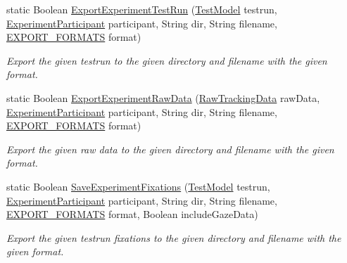 \begin{DoxyCompactItemize}
static Boolean \hyperlink{class_web_analyzer_1_1_controller_1_1_export_controller_a9f312de4f46d4bfb9c33b4f7ce79e79d}{Export\+Experiment\+Test\+Run} (\hyperlink{class_web_analyzer_1_1_models_1_1_data_model_1_1_test_model}{Test\+Model} testrun, \hyperlink{class_web_analyzer_1_1_models_1_1_base_1_1_experiment_participant}{Experiment\+Participant} participant, String dir, String filename, \hyperlink{class_web_analyzer_1_1_controller_1_1_export_controller_a8cea4a311ecaf495f305f9d7829a57aa}{E\+X\+P\+O\+R\+T\+\_\+\+F\+O\+R\+M\+A\+T\+S} format)
\begin{DoxyCompactList}\small\item\em Export the given testrun to the given directory and filename with the given format. \end{DoxyCompactList}\item 
static Boolean \hyperlink{class_web_analyzer_1_1_controller_1_1_export_controller_a67bc9f73d2b99277aa598fd6857ba3d4}{Export\+Experiment\+Raw\+Data} (\hyperlink{class_web_analyzer_1_1_models_1_1_base_1_1_raw_tracking_data}{Raw\+Tracking\+Data} raw\+Data, \hyperlink{class_web_analyzer_1_1_models_1_1_base_1_1_experiment_participant}{Experiment\+Participant} participant, String dir, String filename, \hyperlink{class_web_analyzer_1_1_controller_1_1_export_controller_a8cea4a311ecaf495f305f9d7829a57aa}{E\+X\+P\+O\+R\+T\+\_\+\+F\+O\+R\+M\+A\+T\+S} format)
\begin{DoxyCompactList}\small\item\em Export the given raw data to the given directory and filename with the given format. \end{DoxyCompactList}\item 
static Boolean \hyperlink{class_web_analyzer_1_1_controller_1_1_export_controller_a56bbd706bd4f1e32c603893c5216d132}{Save\+Experiment\+Fixations} (\hyperlink{class_web_analyzer_1_1_models_1_1_data_model_1_1_test_model}{Test\+Model} testrun, \hyperlink{class_web_analyzer_1_1_models_1_1_base_1_1_experiment_participant}{Experiment\+Participant} participant, String dir, String filename, \hyperlink{class_web_analyzer_1_1_controller_1_1_export_controller_a8cea4a311ecaf495f305f9d7829a57aa}{E\+X\+P\+O\+R\+T\+\_\+\+F\+O\+R\+M\+A\+T\+S} format, Boolean include\+Gaze\+Data)
\begin{DoxyCompactList}\small\item\em Export the given testrun fixations to the given directory and filename with the given format. \end{DoxyCompactList}\item 

\end{DoxyCompactItemize}
